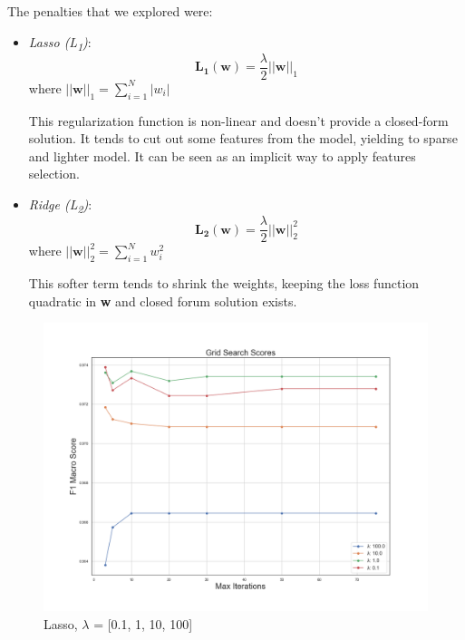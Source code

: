 The penalties that we explored were:
\begin{itemize}
	\item[\PencilRight] \textit{Lasso (L\textsubscript{1})}:
	\[ \mathbf{L_{1}(w) }= \frac{\lambda}{2} ||\mathbf{w}||_{1} \]
	where $ ||\mathbf{w}||_{1} = \sum_{i=1}^{N}|w_{i}| $
		
	This regularization function is non-linear and doesn't provide a closed-form solution. It tends to cut out some features from the model, yielding to sparse and lighter model. It can be seen as an implicit way to apply features selection.
	
	\item[\PencilRight] \textit{Ridge (L\textsubscript{2})}:
	\[ \mathbf{L_{2}(w) }= \frac{\lambda}{2} ||\mathbf{w}||^{2}_{2} \]
	where $ ||\mathbf{w}||^{2}_{2} = \sum_{i=1}^{N}w_{i}^{2} $
	
	This softer term tends to shrink the weights, keeping the loss function quadratic in \textbf{w} and closed forum solution exists.
\end{itemize}
\begin{figure}
	\includegraphics[width=\columnwidth]{chapter5/figure/logreg_l1_lambda.png}\par 
	\caption{Lasso, $ \lambda$ = [0.1, 1, 10, 100]}
	\label{fig:lr_lasso_lambda}
\end{figure}
